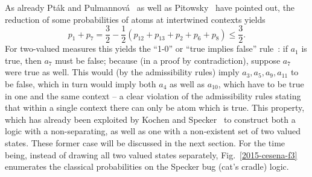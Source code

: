 \documentclass[%
  twocolumn,
 showpacs,
 showkeys,
 preprintnumbers,
 amsmath,amssymb,
 aps,
  pra,
  longbibliography,
 floatfix,
 ]{revtex4-1}
\begin{document}
As already Pt{\'{a}}k and Pulmannov{\'{a}}~\cite[p.~39, Fig.~2.4.6]{pulmannova-91}
as well as
Pitowsky~\cite{Pitowsky2003395,pitowsky-06} have pointed out,
the reduction of some probabilities of atoms at intertwined contexts yields~\cite[p.~285, Eq.~(11.2)]{svozil-2016-s}
\begin{equation}
p_1+p_7=\frac{3}{2}- \frac{1}{2}\left(p_{12}+p_{13}+p_2+p_6+p_8\right)\le \frac{3}{2}
.
\label{2015-s-e2}
\end{equation}
For two-valued measures this yields the ``1-0'' or ``true implies false'' rule~\cite{svozil-2006-omni}:
if $a_1$ is true, then $a_7$ must be false; because (in a proof by contradiction),
suppose $a_7$ were true as well. This would (by the admissibility rules) imply $a_3, a_5, a_9, a_{11}$ to be false, which in turn would imply both $a_4$ as well as $a_{10}$,
which have to be true  in one and the  same context -- a clear violation of the admissibility rules stating
that within a single context there can only be atom which is true.
This property,
which has already been exploited by Kochen and Specker~\cite[$\Gamma_1$]{kochen1}
to construct both a logic with a non-separating,
as well as one with a non-existent set of two valued states. These former case will be discussed in the next section.
For the time being, instead of drawing all two valued states separately,
Fig.~\ref{2015-cesena-f3}  enumerates
the classical probabilities on the Specker bug (cat's cradle) logic.
\end{document}
